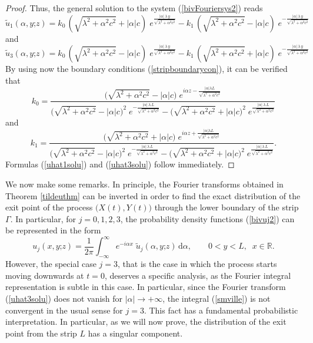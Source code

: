 \documentclass{article}
\begin{document}
\begin{proof}
Thus, the general solution to the system (\ref{bivFouriersys2}) reads
$$\widetilde{u}_1(\alpha,y\mathord{;}z)=k_0\,(\sqrt{\lambda^2+\alpha^2c^2}+\lvert\alpha\lvert c)\;e^{\frac{\lvert\alpha\lvert\,\lambda\,y}{\sqrt{\lambda^2+\alpha^2c^2}}}-k_1\,(\sqrt{\lambda^2+\alpha^2c^2}-\lvert\alpha\lvert c)\;e^{-\frac{\lvert\alpha\lvert\,\lambda\,y}{\sqrt{\lambda^2+\alpha^2c^2}}}$$
and
$$\widetilde{u}_3(\alpha,y\mathord{;}z)=k_0\,(\sqrt{\lambda^2+\alpha^2c^2}-\lvert\alpha\lvert c)\;e^{\frac{\lvert\alpha\lvert\,\lambda\,y}{\sqrt{\lambda^2+\alpha^2c^2}}}-k_1\,(\sqrt{\lambda^2+\alpha^2c^2}+\lvert\alpha\lvert c)\;e^{-\frac{\lvert\alpha\lvert\,\lambda\,y}{\sqrt{\lambda^2+\alpha^2c^2}}}$$
By using now the boundary conditions (\ref{stripboundarycon}), it can be verified that
$$k_0=\frac{\big(\sqrt{\lambda^2+\alpha^2c^2}-\lvert\alpha\lvert c\big)\;e^{i\alpha z-\frac{\lvert\alpha\lvert\lambda L}{\sqrt{\lambda^2+\alpha^2c^2}}}}{\big(\sqrt{\lambda^2+\alpha^2c^2}-\lvert\alpha\lvert c\big)^2\;e^{-\frac{\lvert\alpha\lvert\,\lambda\,L}{\sqrt{\lambda^2+\alpha^2c^2}}}-\big(\sqrt{\lambda^2+\alpha^2c^2}+\lvert\alpha\lvert c\big)^2\;e^{\frac{\lvert\alpha\lvert\,\lambda\,L}{\sqrt{\lambda^2+\alpha^2c^2}}}}$$
and
$$k_1=\frac{\big(\sqrt{\lambda^2+\alpha^2c^2}+\lvert\alpha\lvert c\big)\;e^{i\alpha z+\frac{\lvert\alpha\lvert\lambda L}{\sqrt{\lambda^2+\alpha^2c^2}}}}{\big(\sqrt{\lambda^2+\alpha^2c^2}-\lvert\alpha\lvert c\big)^2\;e^{-\frac{\lvert\alpha\lvert\,\lambda\,L}{\sqrt{\lambda^2+\alpha^2c^2}}}-\big(\sqrt{\lambda^2+\alpha^2c^2}+\lvert\alpha\lvert c\big)^2\;e^{\frac{\lvert\alpha\lvert\,\lambda\,L}{\sqrt{\lambda^2+\alpha^2c^2}}}}.$$
Formulas (\ref{uhat1solu}) and (\ref{uhat3solu}) follow immediately.
\end{proof}
We now make some remarks. In principle, the Fourier transforms obtained in Theorem \ref{tildeuthm} can be inverted in order to find the exact distribution of the exit point of the process $\big(X(t),Y(t)\big)$ through the lower boundary of the strip $\Gamma$. In particular, for $j=0,1,2,3$, the probability density functions (\ref{bivuj2}) can be represented in the form
\begin{equation}u_j(x,y\mathord{;}z)=\frac{1}{2\pi}\int_{-\infty}^{\infty}e^{-i\alpha x}\;\widetilde{u}_j(\alpha,y\mathord{;}z)\,\mathrm{d}\alpha,\qquad 0<y<L,\;\;x\in\mathbb{R}.\label{smville}\end{equation}
However, the special case $j=3$, that is the case in which the process starts moving downwards at $t=0$, deserves a specific analysis, as the Fourier integral representation is subtle in this case. In particular, since the Fourier transform (\ref{uhat3solu}) does not vanish for $\lvert\alpha\lvert\to+\infty$, the integral (\ref{smville}) is not convergent in the usual sense for $j=3$. This fact has a fundamental probabilistic interpretation. In particular, as we will now prove, the distribution of the exit point from the strip $L$ has a singular component.\\
\end{document}
